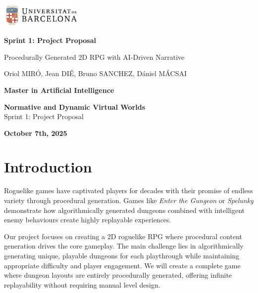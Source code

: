 \documentclass[11pt]{article}
\begin{document}
\begin{titlepage}
    \centering
    \vspace*{1cm}

    \includegraphics[width=0.3\textwidth]{figures/ub_logo.png}

    \vspace{1.5cm}
    {\Huge\bfseries Sprint 1: Project Proposal\par}
    \vspace{1cm}
    {\large Procedurally Generated 2D RPG with AI-Driven Narrative\par}
    \vspace{2cm}
    {\large Oriol MIR\'O, Jean DI\'E, Bruno SANCHEZ, D\'aniel M\'ACSAI\par}
    \vspace{3cm}
    {\large \textbf{Master in Artificial Intelligence}\par}
    \vspace{0.5cm}
    {\large \textbf{Normative and Dynamic Virtual Worlds}\\ Sprint 1: Project Proposal\par}
    \vspace{1cm}
    {\large\bfseries October 7th, 2025\par}
\end{titlepage}

\pagestyle{empty}

\newpage
\tableofcontents
\newpage

\setcounter{page}{1}
\pagestyle{plain}

\section{Introduction}
\label{sec:introduction}

Roguelike games have captivated players for decades with their promise of endless variety through procedural generation. Games like \emph{Enter the Gungeon} or \emph{Spelunky} demonstrate how algorithmically generated dungeons combined with intelligent enemy behaviours create highly replayable experiences.

Our project focuses on creating a 2D roguelike RPG where procedural content generation drives the core gameplay. 
The main challenge lies in algorithmically generating unique, playable dungeons for each playthrough while maintaining appropriate difficulty and player engagement. 
We will create a complete game where dungeon layouts are entirely procedurally generated, offering infinite replayability without requiring manual level design.
\end{document}
